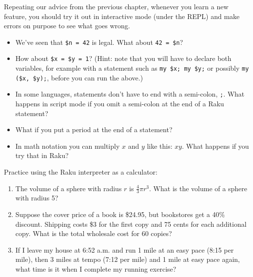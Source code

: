 \begin{exercise}

Repeating our advice from the previous chapter, whenever you learn
a new feature, you should try it out in interactive mode (under 
the REPL) and make errors on purpose to see what goes wrong.

\begin{itemize}

\item We've seen that {\tt \$n = 42} is legal.  What about {\tt 42 = \$n}?

\item How about {\tt \$x = \$y = 1}? (Hint: note that you will 
have to declare both variables, for example with a statement 
such as {\tt my \$x; my \$y;} or possibly {\tt my (\$x, \$y);}, 
before you can run the above.)

\item In some languages, statements don't have to end with a semi-colon, 
{\tt ;}. What happens in script mode if you omit a semi-colon at the end
of a Raku statement?

\item What if you put a period at the end of a statement?

\item In math notation you can multiply $x$ and $y$ like this: $x y$.
What happens if you try that in Raku?

\end{itemize}

\end{exercise}


\begin{exercise}

Practice using the Raku interpreter as a calculator: 

\begin{enumerate}

\item The volume of a sphere with radius $r$ is $\frac{4}{3} \pi r^3$.
  What is the volume of a sphere with radius 5?

\item Suppose the cover price of a book is \$24.95, but bookstores get a
  40\% discount.  Shipping costs \$3 for the first copy and 75 cents
  for each additional copy.  What is the total wholesale cost for
  60 copies?

\item If I leave my house at 6:52 a.m. and run 1 mile at an easy pace
  (8:15 per mile), then 3 miles at tempo (7:12 per mile) and 1 mile at
  easy pace again, what time is it when I complete my running exercise?

\end{enumerate}
\end{exercise}

